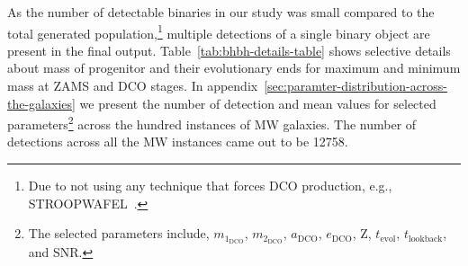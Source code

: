 \documentclass[journal, twocolumns]{IEEEtran}
\newcommand{\mone}[1]{m_{1_{\text{#1}}}}
\newcommand{\mtwo}[1]{m_{2_{\text{#1}}}}
\newcommand{\semaxis}[1]{a_{\text{#1}}}
\newcommand{\ecc}[1]{e_\text{#1}}
\newcommand{\interval}[1]{t_\text{#1}}
\begin{document}
    As the number of detectable binaries in our study was small compared to the total generated population,\footnote{Due to not using any technique that forces DCO production, e.g., STROOPWAFEL~\cite{Broekgaarden2019}.} multiple detections of a single binary object are present in the final output.
    Table~\ref{tab:bhbh-details-table} shows selective details about mass of progenitor and their evolutionary ends for maximum and minimum mass at ZAMS and DCO stages.
    In appendix~\ref{sec:paramter-distribution-across-the-galaxies} we present the number of detection and mean values for selected parameters\footnote{The selected parameters include, $\mone{DCO}$, $\mtwo{DCO}$, $\semaxis{DCO}$, $\ecc{DCO}$, Z, $\interval{evol}$, $\interval{lookback}$, and SNR.} across the hundred instances of MW galaxies.
    The number of detections across all the MW instances came out to be 12758.
    
    
\end{document}
